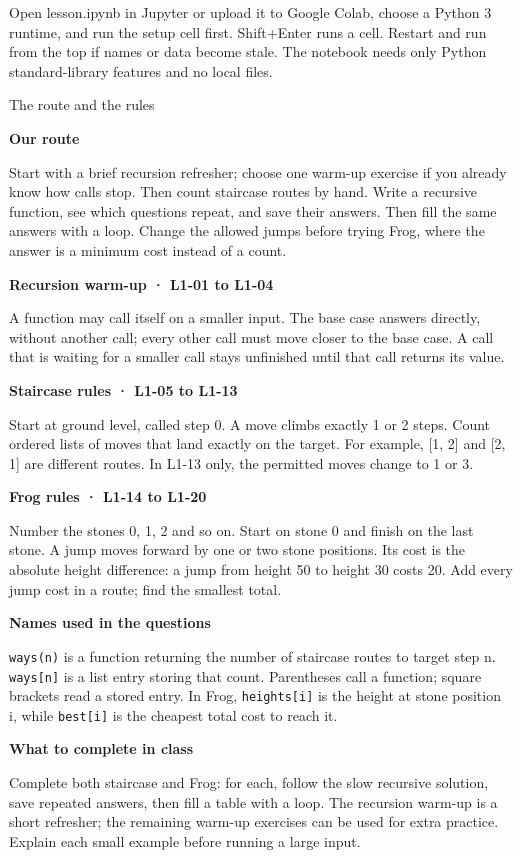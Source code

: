 \documentclass[11pt,a4paper]{article}
\newcommand{\topic}[2]{\clearpage\markboth{#2}{}{\color{quiet}\fontsize{9}{12}\selectfont\textbf{#1}}\par{\heavy\fontsize{19}{23}\selectfont\raggedright #2\par}\vspace{5pt}}
\begin{document}
Open lesson.ipynb in Jupyter or upload it to Google Colab, choose a Python 3 runtime, and run the setup cell first. Shift+Enter runs a cell. Restart and run from the top if names or data become stale. The notebook needs only Python standard-library features and no local files.
\topic{KEEP BESIDE YOUR WORK}{The route and the rules}
\textbf{Our route}\par Start with a brief recursion refresher; choose one warm-up exercise if you already know how calls stop. Then count staircase routes by hand. Write a recursive function, see which questions repeat, and save their answers. Then fill the same answers with a loop. Change the allowed jumps before trying Frog, where the answer is a minimum cost instead of a count.\par\medskip
\textbf{Recursion warm-up · L1-01 to L1-04}\par A function may call itself on a smaller input. The base case answers directly, without another call; every other call must move closer to the base case. A call that is waiting for a smaller call stays unfinished until that call returns its value.\par\medskip
\textbf{Staircase rules · L1-05 to L1-13}\par Start at ground level, called step 0. A move climbs exactly 1 or 2 steps. Count ordered lists of moves that land exactly on the target. For example, [1, 2] and [2, 1] are different routes. In L1-13 only, the permitted moves change to 1 or 3.\par\medskip
\textbf{Frog rules · L1-14 to L1-20}\par Number the stones 0, 1, 2 and so on. Start on stone 0 and finish on the last stone. A jump moves forward by one or two stone positions. Its cost is the absolute height difference: a jump from height 50 to height 30 costs 20. Add every jump cost in a route; find the smallest total.\par\medskip
\textbf{Names used in the questions}\par \texttt{ways(n)} is a function returning the number of staircase routes to target step n. \texttt{ways[n]} is a list entry storing that count. Parentheses call a function; square brackets read a stored entry. In Frog, \texttt{heights[i]} is the height at stone position i, while \texttt{best[i]} is the cheapest total cost to reach it.\par\medskip
\textbf{What to complete in class}\par Complete both staircase and Frog: for each, follow the slow recursive solution, save repeated answers, then fill a table with a loop. The recursion warm-up is a short refresher; the remaining warm-up exercises can be used for extra practice. Explain each small example before running a large input.\par\medskip
\end{document}
